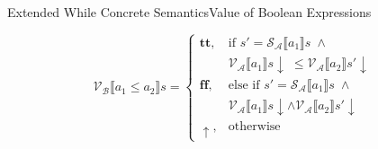 \documentclass{beamer}
\newcommand{\sem}[2]{\mathcal{#1} \llbracket #2 \rrbracket}
\newcommand{\tr}{\mathbf{tt}}
\newcommand{\ff}{\mathbf{ff}}
\newcommand{\undefined}{\uparrow}
\newcommand{\defined}{\!\downarrow}
\begin{document}
\begin{frame}{Extended While Concrete Semantics}{Value of Boolean Expressions}
\begin{overprint}
        \begin{equation*}
            \sem{V_B}{a_1 \leq a_2}s =
            \begin{cases}
                \tr,
                 & \mbox{if } s' = \sem{S_A}{a_1}s \;\wedge                  \\
                 & \sem{V_A}{a_1}s \defined \;\leq \sem{V_A}{a_2}s' \defined \\
                \ff,
                 & \mbox{else if } s' = \sem{S_A}{a_1}s \;\wedge             \\
                 & \sem{V_A}{a_1}s \defined \wedge \sem{V_A}{a_2}s' \defined \\
                \undefined,
                 & \mbox{otherwise}
            \end{cases}
        \end{equation*}
    \end{overprint}

\end{frame}
\end{document}
